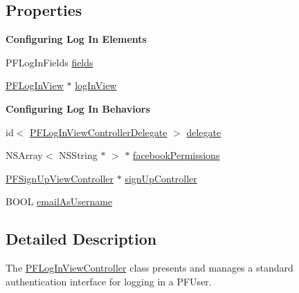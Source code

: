 \subsection*{Properties}
\begin{Indent}{\bf Configuring Log In Elements}\par
{\em 

 

 }\begin{DoxyCompactItemize}
\item 
P\+F\+Log\+In\+Fields \hyperlink{interface_p_f_log_in_view_controller_a9e150a6faf7e08e6bcfb5f120c02ba6f}{fields}
\item 
\hyperlink{interface_p_f_log_in_view}{P\+F\+Log\+In\+View} $\ast$ \hyperlink{interface_p_f_log_in_view_controller_a705c69f6a99cfaf962831623b4d6ccff}{log\+In\+View}
\end{DoxyCompactItemize}
\end{Indent}
\begin{Indent}{\bf Configuring Log In Behaviors}\par
{\em 

 

 }\begin{DoxyCompactItemize}
\item 
id$<$ \hyperlink{protocol_p_f_log_in_view_controller_delegate-p}{P\+F\+Log\+In\+View\+Controller\+Delegate} $>$ \hyperlink{interface_p_f_log_in_view_controller_aee5f26d00a8aa4fa970c0ee8edf18e5b}{delegate}
\item 
N\+S\+Array$<$ N\+S\+String $\ast$ $>$ $\ast$ \hyperlink{interface_p_f_log_in_view_controller_a5663b4bc64642b625eb8369bb09c1ff4}{facebook\+Permissions}
\item 
\hyperlink{interface_p_f_sign_up_view_controller}{P\+F\+Sign\+Up\+View\+Controller} $\ast$ \hyperlink{interface_p_f_log_in_view_controller_a3b23bb61ef95e3e9418f2f6d29420425}{sign\+Up\+Controller}
\item 
B\+O\+O\+L \hyperlink{interface_p_f_log_in_view_controller_a26e4396d8e549640b53d2ec74d7f4a55}{email\+As\+Username}
\end{DoxyCompactItemize}
\end{Indent}


\subsection{Detailed Description}
The {\ttfamily \hyperlink{interface_p_f_log_in_view_controller}{P\+F\+Log\+In\+View\+Controller}} class presents and manages a standard authentication interface for logging in a {\ttfamily P\+F\+User}. 

